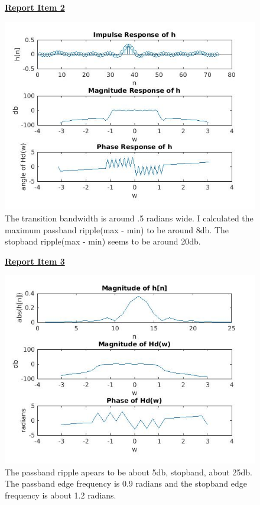 \documentclass{article}
\begin{document}
\begin{figure}[H]
\color{red}
\underline{\textbf{Report Item 2}}
\color{black}

\includegraphics[scale = .5]{report2}
\\The transition bandwidth is around .5 radians wide. I calculated the maximum passband ripple(max - min) to be around 8db. The stopband ripple(max - min) seems to be around 20db.
\end{figure}

\begin{figure}[H]
\color{red}
\underline{\textbf{Report Item 3}}
\color{black}

\includegraphics[scale = .5]{report3}
\\The passband ripple apears to be about 5db, stopband, about 25db. The passband edge frequency is 0.9 radians and the stopband edge frequency is about 1.2 radians.
\end{figure}
\end{document}
